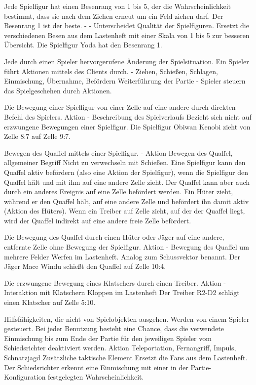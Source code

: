 {Jede Spielfigur hat einen Besenrang von 1 bis 5, der die Wahrscheinlichkeit bestimmt, dass sie nach dem Ziehen erneut um ein Feld ziehen darf. Der Besenrang 1 ist der beste.}
{-}
{-}
{Unterscheidet Qualität der Spielfiguren.}
{Ersetzt die verschiedenen \glqq{}Besen\grqq{} aus dem Lastenheft mit einer Skala von 1 bis 5 zur besseren Übersicht.}
{Die Spielfigur \glqq{}Yoda\grqq{} hat den Besenrang 1.}

{Jede durch einen Spieler hervorgerufene Änderung der Spielsituation. Ein Spieler führt Aktionen mittels des Clients durch.}
{-}
{Ziehen, Schießen, Schlagen, Einmischung, Übernahme, Befördern}
{Weiterführung der Partie}
{-}
{Spieler steuern das Spielgeschehen durch Aktionen.}

{Die Bewegung einer Spielfigur von einer Zelle auf eine andere durch direkten Befehl des Spielers.}
{Aktion}
{-}
{Beschreibung des Spielverlaufs}
{Bezieht sich nicht auf erzwungene Bewegungen einer Spielfigur.}
{Die Spielfigur \glqq{}Obiwan Kenobi\grqq{} zieht von Zelle 8:7 auf Zelle 9:7.}

{Bewegen des Quaffel mittels einer Spielfigur.}
{-}
{Aktion}
{Bewegen des Quaffel, allgemeiner Begriff}
{Nicht zu verwechseln mit Schießen. Eine Spielfigur kann den Quaffel aktiv befördern (also eine Aktion der Spielfigur), wenn die Spielfigur den Quaffel hält und mit ihm auf eine andere Zelle zieht. Der Quaffel kann aber auch durch ein anderes Ereignis auf eine Zelle befördert werden.}
{Ein Hüter zieht, während er den Quaffel hält, auf eine andere Zelle und befördert ihn damit aktiv (Aktion des Hüters). Wenn ein Treiber auf Zelle zieht, auf der der Quaffel liegt, wird der Quaffel indirekt auf eine andere freie Zelle befördert.}

{Die Bewegung des Quaffel durch einen Hüter oder Jäger auf eine andere, entfernte Zelle ohne Bewegung der Spielfigur.}
{Aktion}
{-}
{Bewegung des Quaffel um mehrere Felder}
{\glqq{}Werfen\grqq{}  im Lastenheft. Analog zum Schussvektor benannt.}
{Der Jäger \glqq{}Mace Windu\grqq{} schießt den Quaffel auf Zelle 10:4.}

{Die erzwungene Bewegung eines Klatschers durch einen Treiber.}
{Aktion}
{-}
{Interaktion mit Klatschern}
{\glqq{}Kloppen\grqq{}  im Lastenheft}
{Der Treiber \glqq{}R2-D2\grqq{} schlägt einen Klatscher auf Zelle 5:10.}

{Hilfsfähigkeiten, die nicht von Spielobjekten ausgehen. Werden von einem Spieler gesteuert. Bei jeder Benutzung besteht eine Chance, dass die verwendete Einmischung bis zum Ende der Partie für den jeweiligen Spieler vom Schiedsrichter deaktiviert werden.}
{Aktion}
{Teleportation, Fernangriff, Impuls, Schnatzjagd}
{Zusätzliche taktische Element}
{Ersetzt die \glqq{}Fans\grqq{}  aus dem Lastenheft.}
{Der Schiedsrichter erkennt eine Einmischung mit einer in der Partie-Konfiguration festgelegten Wahrscheinlichkeit.}

